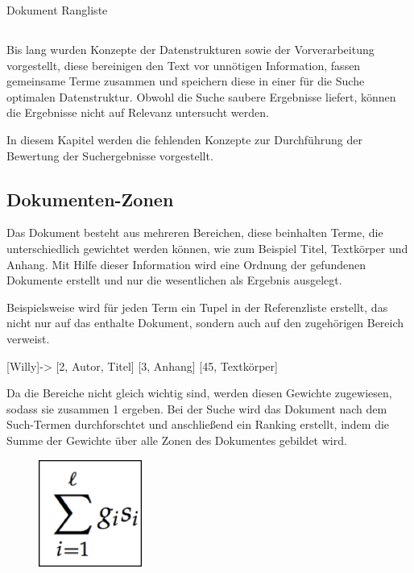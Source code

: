 Dokument Rangliste

\subsection{}
Bis lang wurden Konzepte der Datenstrukturen sowie der Vorverarbeitung
vorgestellt, diese bereinigen den Text vor unnötigen Information,
fassen gemeinsame Terme zusammen und speichern diese in einer für die
Suche optimalen Datenstruktur. Obwohl die Suche saubere Ergebnisse
liefert, können die Ergebnisse nicht auf Relevanz untersucht werden. \ 

In diesem Kapitel werden die fehlenden Konzepte zur Durchführung der
Bewertung der Suchergebnisse vorgestellt.

\subsection[Dokumenten{}-Zonen]{Dokumenten-Zonen}


Das Dokument besteht aus mehreren Bereichen, diese beinhalten Terme, die
unterschiedlich gewichtet werden können, wie zum Beispiel Titel,
Textkörper und Anhang. Mit Hilfe dieser Information wird eine Ordnung
der gefundenen Dokumente erstellt und nur die wesentlichen als Ergebnis
ausgelegt.


Beispielsweise wird für jeden Term ein Tupel in der Referenzliste
erstellt, das nicht nur auf das enthalte Dokument, sondern auch auf den
zugehörigen Bereich verweist. 


[Willy]-{\textgreater} [2, Autor, Titel] [3, Anhang] [45, Textkörper]

Da die Bereiche nicht gleich wichtig sind, werden diesen Gewichte
zugewiesen, sodass sie zusammen 1 ergeben. Bei der Suche wird das
Dokument nach dem Such-Termen durchforschtet und anschließend ein
Ranking erstellt, indem die Summe der Gewichte über alle Zonen des
Dokumentes gebildet wird. 

\begin{figure}
\centering
\includegraphics[width=3.381cm,height=3.507cm]{bilder/SeminararbeitArkadij-img3.png}
\end{figure}



